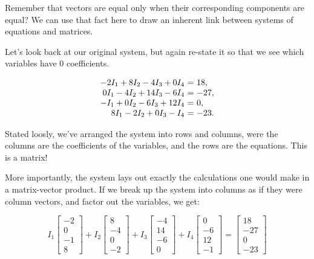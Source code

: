 \documentclass{ximera}
\begin{document}
\begin{exploration}
\begin{example}
\begin{remark}

  Remember that vectors are equal only when their corresponding components are equal? We can use that fact here to draw an inherent link between systems of equations and matrices.

  Let's look back at our original system, but again re-state it so that we see which variables have $0$ coefficients.

  \begin{equation*}
    \begin{array}{r@{~}c@{~}l}
      -2I_1+8I_2-4I_3+0I_4&=&18, \\
      0I_1- 4I_2 + 14I_3 - 6I_4 &=& -27, \\
      -I_1 +0I_2- 6I_3 + 12I_4 &=& 0, \\
      8I_1-2I_2 +0I_3- I_4 &=& -23.
    \end{array}
  \end{equation*}

  Stated loosly, we've arranged the system into rows and columns, were the columns are the coefficients of the variables, and the rows are the equations. This is a matrix!

  More importantly, the system lays out exactly the calculations one would make in a matrix-vector product. If we break up the system into columns as if they were column vectors, and factor out the variables, we get:

$$I_1\begin{bmatrix}-2 \\ 0\\-1\\8\end{bmatrix}
+I_2\begin{bmatrix}8 \\ -4\\0\\-2\end{bmatrix}
+I_3\begin{bmatrix}-4 \\ 14\\-6\\0\end{bmatrix}
+I_4\begin{bmatrix}0 \\ -6\\12\\-1\end{bmatrix}
=
\begin{bmatrix}18 \\ -27\\0\\-23\end{bmatrix}$$


\end{remark}
\end{example}
\end{exploration}
\end{document}
